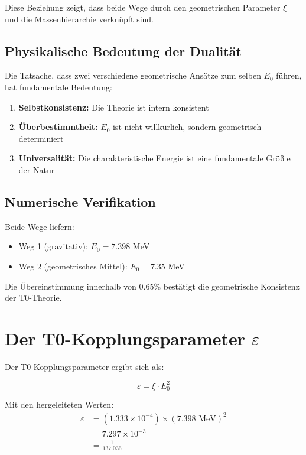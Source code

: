 \documentclass[12pt,a4paper]{article}
\begin{document}
	Diese Beziehung zeigt, dass beide Wege durch den geometrischen Parameter $\xi$ und die Massenhierarchie verknüpft sind.
	
	\subsection{Physikalische Bedeutung der Dualität}
	
	Die Tatsache, dass zwei verschiedene geometrische Ansätze zum selben $E_0$ führen, hat fundamentale Bedeutung:
	
	\begin{enumerate}
		\item \textbf{Selbstkonsistenz:} Die Theorie ist intern konsistent
		\item \textbf{Überbestimmtheit:} $E_0$ ist nicht willkürlich, sondern geometrisch determiniert
		\item \textbf{Universalität:} Die charakteristische Energie ist eine fundamentale Größ e der Natur
	\end{enumerate}
	
	\subsection{Numerische Verifikation}
	
	Beide Wege liefern:
	\begin{itemize}
		\item Weg 1 (gravitativ): $E_0 = 7.398$ MeV
		\item Weg 2 (geometrisches Mittel): $E_0 = 7.35$ MeV
	\end{itemize}
	
	Die Übereinstimmung innerhalb von 0.65\% bestätigt die geometrische Konsistenz der T0-Theorie.
	
	\section{Der T0-Kopplungsparameter $\varepsilon$}
	
	Der T0-Kopplungsparameter ergibt sich als:
	
	\begin{equation}
		\varepsilon = \xi \cdot E_0^2
	\end{equation}
	
	Mit den hergeleiteten Werten:
	\begin{align}
		\varepsilon &= (1.333 \times 10^{-4}) \times (7.398 \text{ MeV})^2\\
		&= 7.297 \times 10^{-3}\\
		&= \frac{1}{137.036}
	\end{align}
	
\end{document}
